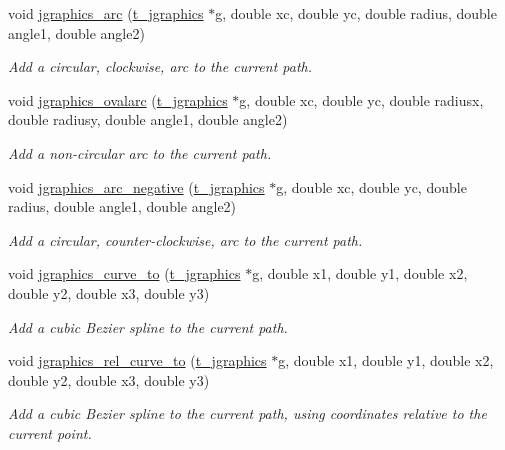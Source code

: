 \begin{DoxyCompactItemize}
void \hyperlink{group__jgraphics_gaeee1dd41f67614a31307cc006f4f39ce}{jgraphics\_\-arc} (\hyperlink{group__jgraphics_ga4bf27bd7e21a59a427481b909d4656e7}{t\_\-jgraphics} $\ast$g, double xc, double yc, double radius, double angle1, double angle2)
\begin{DoxyCompactList}\small\item\em Add a circular, clockwise, arc to the current path. \item\end{DoxyCompactList}\item 
void \hyperlink{group__jgraphics_ga2dde9a34e2863ab5244057c4ef775a0c}{jgraphics\_\-ovalarc} (\hyperlink{group__jgraphics_ga4bf27bd7e21a59a427481b909d4656e7}{t\_\-jgraphics} $\ast$g, double xc, double yc, double radiusx, double radiusy, double angle1, double angle2)
\begin{DoxyCompactList}\small\item\em Add a non-\/circular arc to the current path. \item\end{DoxyCompactList}\item 
void \hyperlink{group__jgraphics_gaafd9fedb4ec2870714890120ae1c353d}{jgraphics\_\-arc\_\-negative} (\hyperlink{group__jgraphics_ga4bf27bd7e21a59a427481b909d4656e7}{t\_\-jgraphics} $\ast$g, double xc, double yc, double radius, double angle1, double angle2)
\begin{DoxyCompactList}\small\item\em Add a circular, counter-\/clockwise, arc to the current path. \item\end{DoxyCompactList}\item 
void \hyperlink{group__jgraphics_ga893fefbf4f38bb4b3b83850c21f8b836}{jgraphics\_\-curve\_\-to} (\hyperlink{group__jgraphics_ga4bf27bd7e21a59a427481b909d4656e7}{t\_\-jgraphics} $\ast$g, double x1, double y1, double x2, double y2, double x3, double y3)
\begin{DoxyCompactList}\small\item\em Add a cubic Bezier spline to the current path. \item\end{DoxyCompactList}\item 
void \hyperlink{group__jgraphics_gac3932cbd8b6a30144f0d827d7f21d16b}{jgraphics\_\-rel\_\-curve\_\-to} (\hyperlink{group__jgraphics_ga4bf27bd7e21a59a427481b909d4656e7}{t\_\-jgraphics} $\ast$g, double x1, double y1, double x2, double y2, double x3, double y3)
\begin{DoxyCompactList}\small\item\em Add a cubic Bezier spline to the current path, using coordinates relative to the current point. \item\end{DoxyCompactList}\item 

\end{DoxyCompactItemize}
